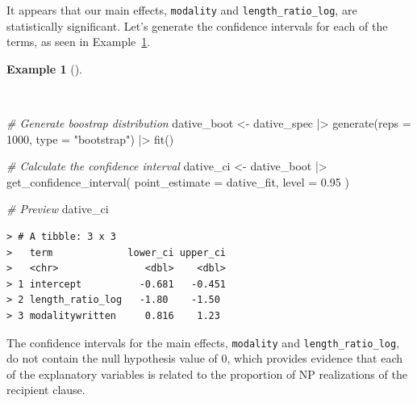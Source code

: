 \documentclass[
  letterpaper,
]{latex/krantz}
\newenvironment{Shaded}{\begin{snugshade}}{\end{snugshade}}
\newcommand{\AttributeTok}[1]{\textcolor[rgb]{0.00,0.00,0.00}{#1}}
\newcommand{\CommentTok}[1]{\textcolor[rgb]{0.00,0.00,0.00}{\textit{#1}}}
\newcommand{\DecValTok}[1]{\textcolor[rgb]{0.00,0.00,0.00}{#1}}
\newcommand{\FloatTok}[1]{\textcolor[rgb]{0.00,0.00,0.00}{#1}}
\newcommand{\FunctionTok}[1]{\textcolor[rgb]{0.00,0.00,0.00}{#1}}
\newcommand{\NormalTok}[1]{\textcolor[rgb]{0.00,0.00,0.00}{#1}}
\newcommand{\OtherTok}[1]{\textcolor[rgb]{0.00,0.00,0.00}{#1}}
\newcommand{\SpecialCharTok}[1]{\textcolor[rgb]{0.00,0.00,0.00}{#1}}
\newcommand{\StringTok}[1]{\textcolor[rgb]{0.00,0.00,0.00}{#1}}
\theoremstyle{definition}
\newtheorem{example}{Example}[chapter]
\theoremstyle{remark}
\begin{document}
It appears that our main effects, \texttt{modality} and
\texttt{length\_ratio\_log}, are statistically significant. Let's
generate the confidence intervals for each of the terms, as seen in
Example~\ref{exm-ida-cat-confidence-interval-logistic-regression}.

\begin{example}[]\protect\hypertarget{exm-ida-cat-confidence-interval-logistic-regression}{}\label{exm-ida-cat-confidence-interval-logistic-regression}

~

\begin{Shaded}
\begin{Highlighting}[]
\CommentTok{\# Generate boostrap distribution}
\NormalTok{dative\_boot }\OtherTok{\textless{}{-}}
\NormalTok{  dative\_spec }\SpecialCharTok{|\textgreater{}}
  \FunctionTok{generate}\NormalTok{(}\AttributeTok{reps =} \DecValTok{1000}\NormalTok{, }\AttributeTok{type =} \StringTok{"bootstrap"}\NormalTok{) }\SpecialCharTok{|\textgreater{}}
  \FunctionTok{fit}\NormalTok{()}

\CommentTok{\# Calculate the confidence interval}
\NormalTok{dative\_ci }\OtherTok{\textless{}{-}}
\NormalTok{  dative\_boot }\SpecialCharTok{|\textgreater{}}
  \FunctionTok{get\_confidence\_interval}\NormalTok{(}
    \AttributeTok{point\_estimate =}\NormalTok{ dative\_fit,}
    \AttributeTok{level =} \FloatTok{0.95}
\NormalTok{  )}

\CommentTok{\# Preview}
\NormalTok{dative\_ci}
\end{Highlighting}
\end{Shaded}

\begin{verbatim}
> # A tibble: 3 x 3
>   term             lower_ci upper_ci
>   <chr>               <dbl>    <dbl>
> 1 intercept          -0.681   -0.451
> 2 length_ratio_log   -1.80    -1.50 
> 3 modalitywritten     0.816    1.23
\end{verbatim}

\end{example}

The confidence intervals for the main effects, \texttt{modality} and
\texttt{length\_ratio\_log}, do not contain the null hypothesis value of
0, which provides evidence that each of the explanatory variables is
related to the proportion of NP realizations of the recipient clause.
\end{document}
